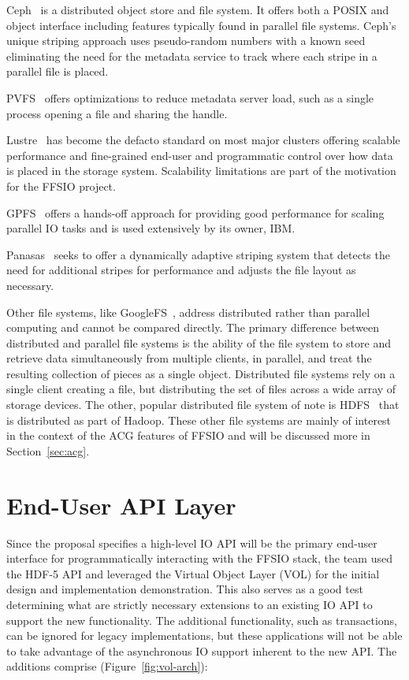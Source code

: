 \documentclass[conference]{IEEEtran}
\begin{document}
Ceph~\cite{weil:ceph} is a distributed object store and file system. It offers
both a POSIX and object interface including features typically found in parallel
file systems. Ceph's unique striping approach uses pseudo-random numbers with a
known seed eliminating the need for the metadata service to track where each
stripe in a parallel file is placed.

PVFS~\cite{carns:pvfs} offers optimizations to reduce metadata server load,
such as a single process opening a file and sharing the handle.

Lustre~\cite{braam:lustre-arch} has become the defacto standard on most major
clusters offering scalable performance and fine-grained end-user and
programmatic control over how data is placed in the storage system. Scalability
limitations are part of the motivation for the FFSIO project.

GPFS~\cite{schmuck:gpfs} offers a hands-off approach for providing good
performance for scaling parallel IO tasks and is used extensively by its owner,
IBM.

Panasas~\cite{panasas:architecture} seeks to offer a dynamically adaptive
striping system that detects the need for additional stripes for performance
and adjusts the file layout as necessary.

Other file systems, like GoogleFS~\cite{ghemawat:googlefs}, address distributed
rather than parallel computing and cannot be compared directly. The primary
difference between distributed and parallel file systems is the ability of the
file system to store and retrieve data simultaneously from multiple clients, in
parallel, and treat the resulting collection of pieces as a single object.
Distributed file systems rely on a single client creating a file, but
distributing the set of files across a wide array of storage devices. The
other, popular distributed file system of note is
HDFS~\cite{Shvachko:2010:hdfs} that is distributed as part of Hadoop. These
other file systems are mainly of interest in the context of the ACG features of
FFSIO and will be discussed more in Section~\ref{sec:acg}.

\section{End-User API Layer}
\label{sec:end-user}

Since the proposal specifies a high-level IO API will be the primary end-user
interface for programmatically interacting with the FFSIO stack, the team used
the HDF-5 API and leveraged the Virtual Object Layer (VOL) for the initial
design and implementation demonstration. This also serves as a good test
determining what are strictly necessary extensions to an existing IO API to
support the new functionality.  The additional functionality, such as
transactions, can be ignored for legacy implementations, but these applications
will not be able to take advantage of the asynchronous IO support inherent to
the new API.  The additions comprise (Figure~\ref{fig:vol-arch}):
\end{document}
